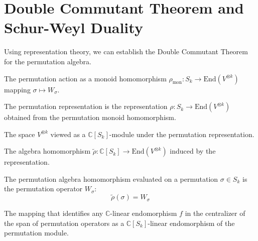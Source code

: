 \section{Double Commutant Theorem and Schur-Weyl Duality}

Using representation theory, we can establish the Double Commutant Theorem for the permutation algebra.

\begin{definition}\label{def:permMonoidHom}
  \leanok
  The permutation action as a monoid homomorphism $\rho_{\text{mon}}: S_k \to \text{End}(V^{\otimes k})$ mapping $\sigma \mapsto W_\sigma$.
\end{definition}

\begin{definition}\label{def:permRep}
  \leanok
  The permutation representation is the representation $\rho: S_k \to \text{End}(V^{\otimes k})$ obtained from the permutation monoid homomorphism.
\end{definition}

\begin{definition}\label{def:PermModule}
  \leanok
  The space $V^{\otimes k}$ viewed as a $\mathbb{C}[S_k]$-module under the permutation representation.
\end{definition}

\begin{definition}\label{def:permAlgHom}
  \leanok
  The algebra homomorphism $\tilde{\rho}: \mathbb{C}[S_k] \to \text{End}(V^{\otimes k})$ induced by the representation.
\end{definition}

\begin{lemma}\label{lem:permAlgHom_of}
  \leanok
  The permutation algebra homomorphism evaluated on a permutation $\sigma \in S_k$ is the permutation operator $W_\sigma$:
  \begin{equation}
    \tilde{\rho}(\sigma) = W_\sigma
  \end{equation}
\end{lemma}

\begin{definition}\label{def:centralizer_to_endModule}
  \leanok
  The mapping that identifies any $\mathbb{C}$-linear endomorphism $f$ in the centralizer of the span of permutation operators as a $\mathbb{C}[S_k]$-linear endomorphism of the permutation module.
\end{definition}

